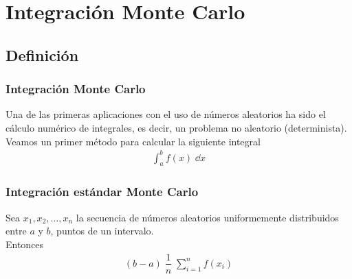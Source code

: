 \section{Integración Monte Carlo}
\subsection{Definición}
\begin{frame}
\frametitle{Integración Monte Carlo}
Una de las primeras aplicaciones con el uso de números aleatorios ha sido el cálculo numérico de integrales, es decir, un problema no aleatorio (determinista).
\\
\bigskip
Veamos un primer método para calcular la siguiente integral
\begin{align*}
\int_{a}^{b} f(x) \; \dd{x}
\end{align*}
\end{frame}
\begin{frame}
\frametitle{Integración estándar Monte Carlo}
Sea $x_{1}, x_{2}, \ldots, x_{n}$ la secuencia de números aleatorios uniformemente distribuidos entre $a$ y $b$, puntos de un intervalo.
\\
\bigskip
Entonces
\begin{align}
(b - a) \; \dfrac{1}{n} \; \sum_{i=1}^{n} f(x_{i})
\label{eq:ecuacion_08_07}
\end{align}
\end{frame}
